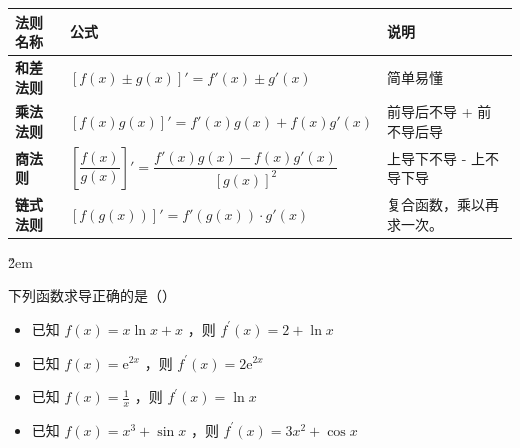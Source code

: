 \begin{center}
    \begin{tabular}{l l p{6cm}}
        \toprule
        \textbf{法则名称}                                                                & \textbf{公式} & \textbf{说明} \\
        \midrule

        \textbf{和差法则}                                                                &
        $[f(x) \pm g(x)]' = f'(x) \pm g'(x)$                                         &
        简单易懂                                                                                                     \\

        \addlinespace %

        \textbf{乘法法则}                                                                &
        $[f(x)g(x)]' = f'(x)g(x) + f(x)g'(x)$                                        &
        前导后不导 + 前不导后导                                                                                            \\

        \addlinespace

        \textbf{商法则}                                                                 &
        $\left[\dfrac{f(x)}{g(x)}\right]' = \dfrac{f'(x)g(x) - f(x)g'(x)}{[g(x)]^2}$ &
        上导下不导 - 上不导下导                                                                                            \\

        \addlinespace

        \textbf{链式法则}                                                                &
        $[f(g(x))]' = f'(g(x)) \cdot g'(x)$                                          &
        复合函数，乘以再求一次。                                                                                             \\

        \bottomrule
    \end{tabular}
\end{center}

\v{2em}

\begin{example}
    下列函数求导正确的是（\quad ）
    \begin{itemize}
        \item 已知 $f(x)=x \ln x+x$ ，则 $f^{\prime}(x)=2+\ln x$
        \item 已知 $f(x)=\mathrm{e}^{2 x}$ ，则 $f^{\prime}(x)=2 \mathrm{e}^{2 x}$
        \item 已知 $f(x)=\frac{1}{x}$ ，则 $f^{\prime}(x)=\ln x$
        \item 已知 $f(x)=x^3+\sin x$ ，则 $f^{\prime}(x)=3 x^2+\cos x$
    \end{itemize}
\end{example}

